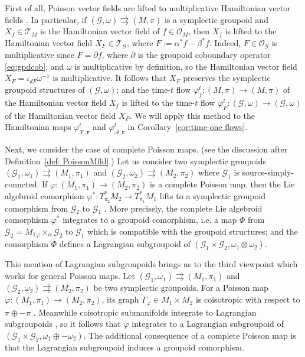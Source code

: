 \documentclass{amsart}
\numberwithin{equation}{section}
\newcommand{\bfr}{{\boldsymbol{r}}}
\newcommand{\cA}{\mathcal{A}}
\newcommand{\cG}{\mathcal{G}}
\newcommand{\cO}{\mathcal{O}}
\newcommand{\cT}{\mathcal{T}}
\newcommand{\cX}{\mathcal{X}}
\newcommand{\rra}{\rightrightarrows}
\begin{document}
First of all, Poisson vector fields are lifted to multiplicative Hamiltonian vector fields \cite{MR2504211}. In particular, if $(\cG, \omega) \rra (M, \pi)$ is a symplectic groupoid and $X_f \in \cT_M$ is the Hamiltonian vector field of $f \in \cO_M$, then $X_f$ is lifted to the Hamiltonian vector field $X_F \in \cT_\cG$, where $F := \alpha^*f - \beta^*f$.
Indeed, $F \in \cO_\cG$ is multiplicative since $F = \partial f$, where $\partial$ is the groupoid coboundary operator \eqref{eq:gpdcob}, and $\omega$ is multiplicative by definition, so the Hamiltonian vector field $X_F = \iota_{dF}\omega^{-1}$ is multiplicative. It follows that $X_F$ preserves the symplectic groupoid structures of $(\cG,\omega)$; and the time-$t$ flow $\varphi^t_f: (M, \pi) \to (M, \pi)$ of the Hamiltonian vector field $X_f$ is lifted to the time-$t$ flow $\varphi^t_F: (\cG, \omega) \to (\cG, \omega)$ of the Hamiltonian vector field $X_F$. We will apply this method to the Hamiltonian maps $\varphi_{\cX,\bfr}^t$ and $\varphi_{\cA,\bfr}^t$ in Corollary~\ref{cor:time-one flows}.

Next, we consider the case of complete Poisson maps. (see the discussion after Definition~\ref{def: PoissonMfld}.) Let us consider two symplectic groupoids $(\cG_1, \omega_1) \rra (M_1, \pi_1)$ and $(\cG_2, \omega_2) \rra (M_2, \pi_2)$ where $\cG_1$ is source-simply-conncted. If $\varphi: (M_1, \pi_1) \to (M_2, \pi_2)$ is a complete Poisson map, then the Lie algebroid comorphism $\varphi^*: T^*_{\pi_2} M_2 \to T^*_{\pi_1} M_1$ lifts to a symplectic groupoid comorphism from $\cG_2$ to $\cG_1$ \cite{MR3089758}. More precisely, the complete Lie algebroid comorphism $\varphi^*$ integrates to a groupoid comorphism, i.e. a map $\Phi$ from $\cG_2 = M_1 {_\varphi \times_{\alpha}} \cG_2$ to $\cG_1$ which is compatible with the groupoid structures; and the comorphism $\Phi$ defines a Lagrangian subgroupoid of
$(\cG_1 \times \cG_2, \omega_1 \otimes \omega_2)$.

This mention of Lagrangian subgroupoids brings us to the third viewpoint which works for general Poisson maps. Let $(\cG_1, \omega_1) \rra (M_1, \pi_1)$ and $(\cG_2, \omega_2) \rra (M_2, \pi_2)$ be two symplectic groupoids. For a Poisson map $\varphi: (M_1, \pi_1) \to (M_2, \pi_2)$, its graph $\Gamma_\varphi \in M_1 \times M_2$ is coisotropic with respect to $\pi \oplus -\pi$ \cite{MR959095}. Meanwhile coisotropic submanifolds integrate to Lagrangian subgroupoids \cite{MR2063018}, so it follows that $\varphi$ integrates to a Lagrangian subgroupoid of $(\cG_1\times\cG_2, \omega_1\oplus-\omega_2)$. The additional consequence of a complete Poisson map is that the Lagrangian subgroupoid induces a groupoid comorphism.
\end{document}
